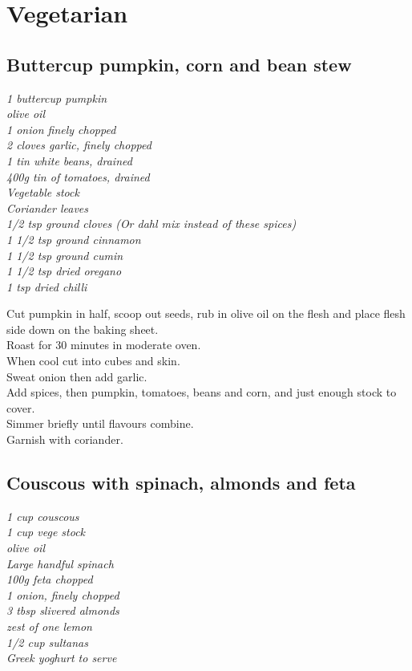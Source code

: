 \documentclass{tufte-book}
\begin{document}
\chapter{Vegetarian}

\section{Buttercup pumpkin, corn and bean stew}

\emph{1 buttercup pumpkin
\\olive oil
\\1 onion finely chopped
\\2 cloves garlic, finely chopped
\\1 tin white beans, drained
\\400g tin of tomatoes, drained
\\Vegetable stock
\\Coriander leaves 
\\1/2 tsp ground cloves  (Or dahl mix instead of these spices)
\\1 1/2 tsp ground cinnamon
\\1 1/2 tsp ground cumin
\\1 1/2 tsp dried oregano
\\1 tsp dried chilli
}

Cut pumpkin in half, scoop out seeds, rub in olive oil on the flesh and place flesh side down on the baking sheet.
\\Roast for 30 minutes in moderate oven.
\\When cool cut into cubes and skin.
\\Sweat onion then add garlic.
\\Add spices, then pumpkin, tomatoes, beans and corn, and just enough stock to cover.
\\Simmer briefly until flavours combine. 
\\Garnish with coriander.



\section{Couscous with spinach, almonds and feta}

\emph{1 cup couscous
\\1 cup vege stock
\\olive oil
\\Large handful spinach
\\100g feta chopped
\\1 onion, finely chopped
\\3 tbsp slivered almonds
\\zest of one lemon
\\1/2 cup sultanas
\\Greek yoghurt to serve
}
\end{document}
